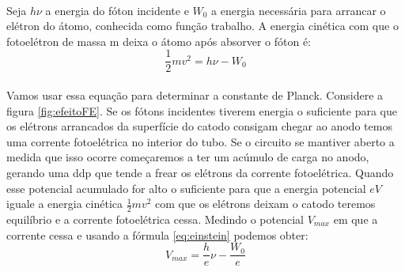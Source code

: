 \documentclass[a4paper,11pt]{article}
\begin{document}
\paragraph{}Seja $h\nu$ a energia do fóton incidente e
$W_0$ a energia necessária para arrancar o elétron do átomo,
conhecida como função trabalho. A energia cinética com que o
fotoelétron de massa m deixa o átomo após absorver o fóton é:
\begin{equation}
  \frac{1}{2} mv^2 = h\nu - W_0
  \label{eq:einstein}
\end{equation}

\paragraph{} Vamos usar essa equação para determinar a
constante de Planck.
Considere a figura \ref{fig:efeitoFE}. Se os
fótons incidentes tiverem energia o suficiente para que os
elétrons arrancados da superfície do catodo consigam chegar
ao anodo temos uma corrente fotoelétrica no interior do
tubo. Se o circuito se mantiver aberto a medida que isso
ocorre começaremos a ter um acúmulo de carga no anodo,
gerando uma ddp que tende a frear os elétrons da corrente
fotoelétrica. Quando esse potencial acumulado for alto o
suficiente para que a energia potencial $eV$ iguale a energia
cinética $\frac{1}{2}mv^2$ com que os
elétrons deixam o catodo teremos equilíbrio e a corrente
fotoelétrica cessa. Medindo o potencial $V_{max}$ em que a corrente
cessa e usando a fórmula \ref{eq:einstein} podemos obter:
\begin{equation}
  V_{max} = \frac{h}{e}\nu - \frac{W_0}{e}
  \label{eq:IMPORTANTE}
\end{equation}
\end{document}
